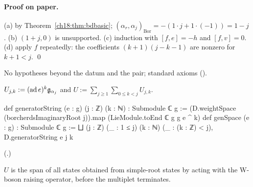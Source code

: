 \paragraph{Proof on paper.}  (a) by Theorem~\ref{ch18:thm:bdbasic}; $(\alpha_r,\alpha_j)_{\mathrm{Bor}}=-(1\cdot j+1\cdot(-1))=1-j$.  (b) $(1+j,0)$ is
unsupported.  (c) induction with $[f,e]=-h$ and $[f,v]=0$.  (d) apply $f$ repeatedly: the coefficients $(k+1)(j-k-1)$
are nonzero for $k+1<j$. \qed
\begin{status}No hypotheses beyond the datum and the pair; standard axioms ().\end{status}

\begin{definition}\label{ch18:def:U}
$U_{j,k}:=(\mathrm{ad}\,e)^k\mathfrak{g}_{\alpha_j}$ and $U:=\sum_{j\ge1}\sum_{0\le k<j}U_{j,k}$.
\end{definition}
\begin{leancode}
def generatorString (e : g) (j : ℤ) (k : ℕ) : Submodule ℂ g :=
  (D.weightSpace (borcherdsImaginaryRoot j)).map (LieModule.toEnd ℂ g g e ^ k)
def genSpace (e : g) : Submodule ℂ g :=
  ⨆ (j : ℤ) (_ : 1 ≤ j) (k : ℕ) (_ : (k : ℤ) < j), D.generatorString e j k
\end{leancode}
(.)
\begin{physics}
$U$ is the span of all states obtained from simple-root states by acting with the W-boson raising operator, before the
multiplet terminates.
\end{physics}

